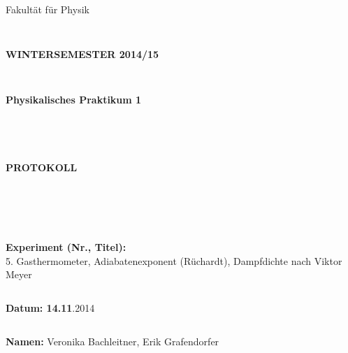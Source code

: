 \documentclass{article}
\begin{document}
\thispagestyle{empty}
			\begin{center}
			\Large{Fakultät für Physik}\\
			\end{center}
\begin{verbatim}


\end{verbatim}
			\begin{center}
			\textbf{\LARGE WINTERSEMESTER 2014/15}
			\end{center}
\begin{verbatim}


\end{verbatim}
			\begin{center}
			\textbf{\LARGE{Physikalisches Praktikum 1}}
			\end{center}
\begin{verbatim}




\end{verbatim}

			\begin{center}
			\textbf{\LARGE{PROTOKOLL}}
			\end{center}
			
\begin{verbatim}





\end{verbatim}

			\begin{flushleft}
			\textbf{\Large{Experiment (Nr., Titel):}}\\
			\LARGE{5. Gasthermometer, Adiabatenexponent (Rüchardt), Dampfdichte nach Viktor Meyer}	
			\end{flushleft}

\begin{verbatim}

\end{verbatim}	
			\begin{flushleft}
			\textbf{\Large{Datum: 14.11}}\Large{.2014}
			\end{flushleft}
			
\begin{verbatim}
\end{verbatim}
		\begin{flushleft}
			\textbf{\Large{Namen:}} \Large{Veronika Bachleitner, Erik Grafendorfer}
			\end{flushleft}
\end{document}
